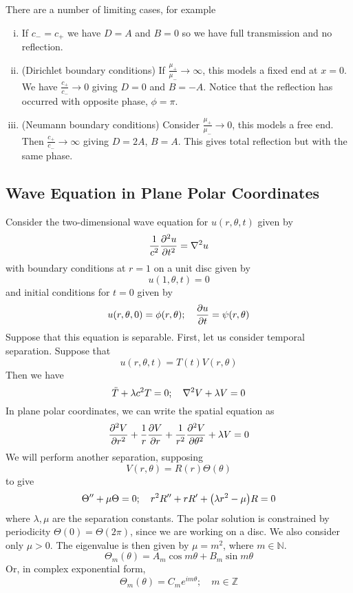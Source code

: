 There are a number of limiting cases, for example
\begin{enumerate}[(i)]
    \item If \( c_- = c_+ \) we have \( D = A \) and \( B = 0 \) so we have full transmission and no reflection.
    \item (Dirichlet boundary conditions) If \( \frac{\mu_+}{\mu_-} \to \infty \), this models a fixed end at \( x = 0 \). We have \( \frac{c_+}{c_-} \to 0 \) giving \( D = 0 \) and \( B = -A \).
    Notice that the reflection has occurred with opposite phase, \( \phi = \pi \).
    \item (Neumann boundary conditions) Consider \( \frac{\mu_+}{\mu_-} \to 0 \), this models a free end. Then \( \frac{c_+}{c_-} \to \infty \) giving \( D = 2A \), \( B = A \).
    This gives total reflection but with the same phase.
\end{enumerate}

\subsection{Wave Equation in Plane Polar Coordinates}
Consider the two-dimensional wave equation for \( u(r,\theta,t) \) given by
\[ \frac{1}{c^2} \pdv[2]{u}{t} = \laplacian u \]
with boundary conditions at \( r = 1 \) on a unit disc given by
\[ u(1,\theta,t) = 0 \]
and initial conditions for \( t = 0 \) given by
\[ u(r,\theta,0) = \phi(r,\theta);\quad \pdv{u}{t}(r,\theta,0) = \psi(r,\theta) \]
Suppose that this equation is separable.
First, let us consider temporal separation.
Suppose that
\[ u(r,\theta,t) = T(t) V(r,\theta) \]
Then we have
\[ \ddot T + \lambda c^2 T = 0;\quad \laplacian V + \lambda V = 0 \]
In plane polar coordinates, we can write the spatial equation as
\[ \pdv[2]{V}{r} + \frac{1}{r} \pdv{V}{r} + \frac{1}{r^2}\pdv[2]{V}{\theta} + \lambda V = 0 \]
We will perform another separation, supposing
\[ V(r,\theta) = R(r) \Theta(\theta) \]
to give
\[ \Theta'' + \mu \Theta = 0;\quad r^2 R'' + r R' + \qty(\lambda r^2 - \mu) R = 0 \]
where \( \lambda, \mu \) are the separation constants.
The polar solution is constrained by periodicity \( \Theta(0) = \Theta(2 \pi) \), since we are working on a disc.
We also consider only \( \mu > 0 \).
The eigenvalue is then given by \( \mu = m^2 \), where \( m \in \mathbb N \).
\[ \Theta_m(\theta) = A_m \cos m \theta + B_m \sin m \theta \]
Or, in complex exponential form,
\[ \Theta_m(\theta) = C_m e^{im\theta};\quad m \in \mathbb Z \]

